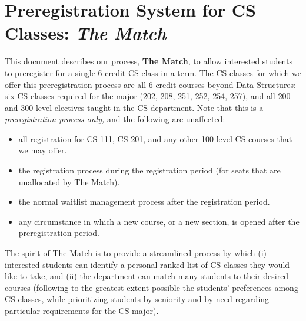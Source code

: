 \documentclass{article}
\begin{document}
\enlargethispage{3\baselineskip}
\section*{Preregistration System for CS Classes:  \emph{The Match}}


This document describes our process, \textbf{The Match}, to allow interested students to preregister for a single 6-credit CS class in a term.  The CS classes for which we offer this preregistration process are all 6-credit courses beyond Data Structures: six CS classes required for the major (202, 208, 251, 252, 254, 257), and all 200- and 300-level electives taught in the CS department.  Note that this is a \emph{preregistration process only,} and the following are unaffected:
  \begin{itemize}[itemsep=0pc]
  \item all registration for CS 111, CS 201, and any other 100-level CS courses that we may offer.
  \item the registration process during the registration period (for seats that are unallocated by The Match).
  \item the normal waitlist management process after the registration period.
  \item any circumstance in which a new course, or a new section, is opened after the preregistration period.
  \end{itemize}
The spirit of The Match is to provide a streamlined process by which (i) interested students can identify a personal ranked list of CS classes they would like to take, and (ii) the department can match many students to their desired courses (following to the greatest extent possible the students' preferences among CS classes, while prioritizing students by seniority and by need regarding particular requirements for the CS major).
\end{document}
